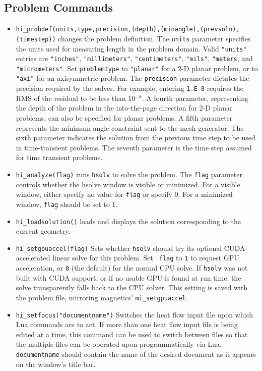 \subsection{Problem Commands}

\begin{itemize}
\item {\tt hi\_probdef(units,type,precision,(depth),(minangle),(prevsoln),(timestep))} changes the problem
definition. The \texttt{units} parameter specifies the units used
for measuring length in the problem domain. Valid \texttt{"units"}
entries are
\texttt{"inches"}, \texttt{"millimeters"}, \texttt{"centimeters"},
\texttt{"mils"}, \texttt{"meters}, and \texttt{"micrometers"}. Set
\texttt{problemtype} to \texttt{"planar"} for a 2-D planar problem, or to
\texttt{"axi"} for an axisymmetric problem. The \texttt{precision} parameter
dictates the precision required by the solver. For example, entering
\texttt{1.E-8} requires the RMS of the residual to be less than 10$^{ - 8}$.
A fourth parameter, representing the depth of the problem in the
into-the-page direction for 2-D planar problems, can also be specified
for planar problems. A fifth parameter represents the minimum angle constraint sent to the mesh generator.
The sixth parameter indicates the solution from the previous time step
to be used in time-transient problems. The seventh parameter is the time step assumed
for time transient problems.

\item {\tt hi\_analyze(flag)} runs \texttt{hsolv} to solve the problem. The
\texttt{flag} parameter controls whether the hsolve window is visible or
minimized. For a visible window, either specify no value for
\texttt{flag} or specify 0. For a minimized window, \texttt{flag}
should be set to 1.

\item {\tt hi\_loadsolution()} loads and displays the solution corresponding to the
current geometry.

\item{\tt hi\_setgpuaccel(flag)} Sets whether {\tt hsolv} should try
its optional CUDA-accelerated linear solve for this problem. Set {\tt
flag} to {\tt 1} to request GPU acceleration, or {\tt 0} (the default)
for the normal CPU solve. If {\tt hsolv} was not built with CUDA
support, or if no usable GPU is found at run time, the solve
transparently falls back to the CPU solver. This setting is saved with
the problem file, mirroring magnetics' {\tt mi\_setgpuaccel}.

\item {\tt hi\_setfocus("documentname")} Switches the
heat flow input file upon which Lua commands are to act. If
more than one heat flow input file is being edited at a time,
this command can be used to switch between files so that the
multiple files can be operated upon programmatically via Lua. {\tt
documentname} should contain the name of the desired document as
it appears on the window's title bar.


\end{itemize}
